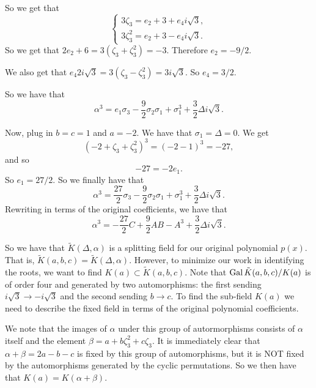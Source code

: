So we get that
\begin{equation}
\begin{cases}
    3\zeta_3 = e_2 + 3 + e_4i\sqrt{3}, \\
    3\zeta_3^2 = e_2 + 3 - e_4i\sqrt{3}.
\end{cases}
\end{equation}
So we get that \(2e_2 + 6 = 3(\zeta_3 + \zeta_3^2) = -3\). Therefore \(e_2 = -9/2\).

We also get that \(e_4 2i\sqrt{3} = 3(\zeta_3 - \zeta_3^2) = 3i\sqrt{3}\). So \(e_4 = 3 / 2\). 

So we have that
\begin{equation}
\alpha^3 = e_1 \sigma_3 - \frac{9}{2} \sigma_2 \sigma_1 + \sigma_1^3
    + \frac{3}{2} \Delta i\sqrt{3}.
\end{equation}

Now, plug in \(b = c = 1\) and \(a = -2\). We have that \(\sigma_1 = \Delta = 0\). We get
\begin{equation}
(-2 + \zeta_3 + \zeta_3^2)^3 = (-2 - 1)^3 = -27,
\end{equation}
and so
\begin{equation}
-27 = -2 e_1.
\end{equation}
So \(e_1 = 27/2\). So we finally have that
\begin{equation}
\alpha^3 = \frac{27}{2} \sigma_3 - \frac{9}{2} \sigma_2 \sigma_1 + \sigma_1^3
    + \frac{3}{2} \Delta i\sqrt{3}.
\end{equation}
Rewriting in terms of the original coefficients, we have that
\begin{equation}
\alpha^3 = -\frac{27}{2} C + \frac{9}{2} AB - A^3
    + \frac{3}{2} \Delta i\sqrt{3}.
\end{equation}

So we have that \(\tilde K(\Delta, \alpha)\) is a splitting field for our original polynomial \(p(x)\).
That is, \(\tilde K(a, b, c) = \tilde K(\Delta, \alpha)\). However, to minimize our work in identifying
the roots, we want to find \(K(a) \subset \tilde K(a, b, c)\). Note that 
\(\operatorname{Gal} \tilde K(a,b,c) / K(a)\) is of order four and generated by two automorphisms:
the first sending \(i\sqrt{3} \to -i\sqrt{3}\) and the second sending \(b \to c\). To find the
sub-field \(K(a)\) we need to describe the fixed field in terms of the original 
polynomial coefficients.

We note that the images of \(\alpha\) under this group of autormorphisms consists of \(\alpha\) itself
and the element \(\beta = a + b\zeta_3^2 + c \zeta_3\). It is immediately clear that 
\(\alpha + \beta = 2a - b -c\) is fixed by this group of automorphisms, but it is NOT fixed by the 
automorphisms generated by the cyclic permutations.
So we then have that \(K(a) = K(\alpha + \beta)\).

